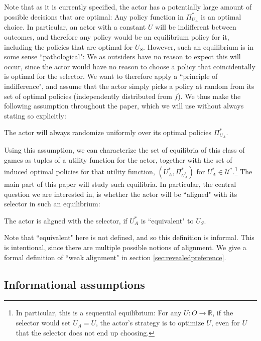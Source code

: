 Note that as it is currently specified, the actor has a potentially large amount of possible decisions that are optimal: Any policy function in $\Pi^*_{U_A}$ is an optimal choice. In particular, an actor with a constant $U$ will be indifferent between outcomes, and therefore any policy would be an equilibrium policy for it, including the policies that are optimal for $U_S$. However, such an equilibrium is in some sense ``pathological": We as outsiders have no reason to expect this will occur, since the actor would have no reason to choose a policy that coincidentally is optimal for the selector. We want to therefore apply a ``principle of indifference", and assume that the actor simply picks a policy at random from its set of optimal policies (independently distributed from $f$). We thus make the following assumption throughout the paper, which we will use without always stating so explicitly:
\begin{assumption*}
	The actor will always randomize uniformly over its optimal policies $\Pi_{U_A}^*$.
\end{assumption*}


Using this assumption, we can characterize the set of equilibria of this class of games as tuples of a utility function for the actor, together with the set of induced optimal policies for that utility function, $(U_A^*,\Pi_{U_A^*}^*)$ for $U_A^*\in\mathcal U^*$.\footnote{In particular, this is a sequential equilibrium: For any $U\colon O\to \mathbb R$, if the selector would set $U_A=U$, the actor's strategy is to optimize $U$, even for $U$ that the selector does not end up choosing.} The main part of this paper will study such equilibria. In particular, the central question we are interested in, is whether the actor will be ``aligned" with its selector in such an equilibrium:

\begin{definition}[Alignment]
	The actor is aligned with the selector, if $U_A^*$ is ``equivalent" to $U_S$.
\end{definition}

Note that ``equivalent" here is not defined, and so this definition is informal. This is intentional, since there are multiple possible notions of alignment. We give a formal definition of ``weak alignment" in section \ref{sec:revealedpreference}.


\subsection{Informational assumptions}


